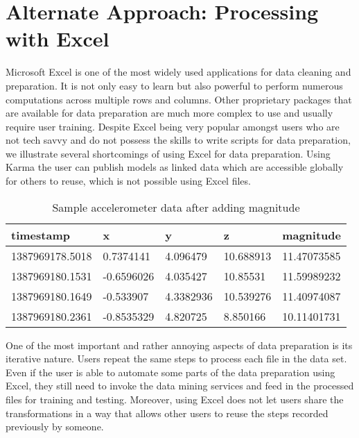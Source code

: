 \section{Alternate Approach: Processing with Excel}

Microsoft Excel is one of the most widely used applications for data cleaning and preparation. It is not only easy to learn but also powerful to perform numerous computations across multiple rows and columns. Other proprietary packages that are available for data preparation are much more complex to use and usually require  user training. Despite Excel being very popular amongst users who are not tech savvy and do not possess the skills to write scripts for data preparation, we illustrate several shortcomings of using Excel for data preparation. Using Karma the user can publish models as linked data which are accessible globally for others to reuse, which is not possible using Excel files.

\begin{table}[h]
	\centering	
	\caption{Sample accelerometer data after adding magnitude\label{tab:sample_data_acce}}
  	\begin{tabular}{ | p{2cm} | p{1.3cm} | p{1cm} | p{1cm} | p{1.5cm} | }
    	\hline
	    \textbf{timestamp} & \textbf{x} & \textbf{y} & \textbf{z} & \textbf{magnitude} \\ \hline
		1387969178.5018 & 0.7374141 & 4.096479 & 10.688913 & 11.47073585 \\ \hline
		1387969180.1531 & -0.6596026 & 4.035427 & 10.85531 & 11.59989232 \\ \hline
		1387969180.1649 & -0.533907 & 4.3382936 & 10.539276 & 11.40974087 \\ \hline
		1387969180.2361 & -0.8535329 & 4.820725 & 8.850166 & 10.11401731 \\
	    \hline
  	\end{tabular}
\end{table}

One of the most important and rather annoying aspects of data preparation is its iterative nature. Users repeat the same steps to process each file in the data set. Even if the user is able to automate some parts of the data preparation using Excel, they still need to invoke the data mining services and feed in the processed files for training and testing. Moreover, using Excel does not let users share the transformations in a way that allows other users to reuse the steps recorded previously by someone. 

